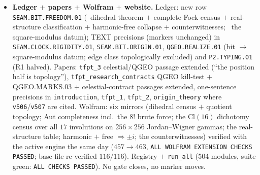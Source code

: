 \begin{itemize}[leftmargin=1.5em]
clock) --- the Fock dichotomy measures the CLASS, not the modulus. Premise typing: (P-i) deck $=$
M\"obius covering deck $\Rightarrow$ free [standard topology; the one-sidedness strand
\texttt{origin\_theory}/\texttt{v456}]; (P-ii) marks on the $\Theta$-fix seam circle $=$ existing
REALIZE \mC\ content (\texttt{QGEO.REALIZE.02} hypotheses, \texttt{v264}) --- NO new input. Audit
finding documented: ``circle-freeness'' was nowhere typed before (only mark-freeness, \texttt{v216});
\texttt{v507} F1.1 explicitly admitted the reflection reading of the edge class --- \texttt{v510}
closes that door (a reflection is not a covering deck). The \mC\ rest, verbatim: \emph{the alignment
bit reduces from ``harmonic AND central'' to the square-modulus datum $\tau=i$ alone; the position
half is topology (edge class excluded), the modulus half stays the one carrier input.}
Discovery provenance: \texttt{experiments/tfpt-discovery/qgeo\_realize\_deck\_freedom\_dihedral\_probe.py}
($14/14$) and \texttt{qgeo\_realize\_rp\_fixcircle\_moebius\_probe.py} ($16/16$), same day.
\item \textbf{Ledger $+$ papers $+$ Wolfram $+$ website.} Ledger: new row
\texttt{SEAM.BIT.FREEDOM.01} (\mE\ dihedral theorem $+$ complete Fock census $+$ real-structure
classification $+$ harmonic-free collapse $+$ counterwitnesses; \mC\ the square-modulus datum);
TEXT precisions (markers unchanged) in \texttt{SEAM.CLOCK.RIGIDITY.01}, \texttt{SEAM.BIT.ORIGIN.01},
\texttt{QGEO.REALIZE.01} (bit $\to$ square-modulus datum; edge class topologically excluded) and
\texttt{P2.TYPING.01} (R1 halved). Papers: \texttt{tfpt\_3} celestial/QGEO passage extended
(``the position half is topology''), \texttt{tfpt\_research\_contracts} QGEO kill-test $+$
QGEO.MARKS.03 $+$ celestial-contract passages extended, one-sentence precisions in
\texttt{introduction}, \texttt{tfpt\_1}, \texttt{tfpt\_2}, \texttt{origin\_theory} where
\texttt{v506}/\texttt{v507} are cited. Wolfram: six mirrors (dihedral census $+$ quotient topology;
Aut completeness incl.\ the $8!$ brute force; the $\mathrm{Cl}(16)$ dichotomy census over all $17$
involutions on $256\times256$ Jordan--Wigner gammas; the real-structure table; harmonic $+$ free
$\Rightarrow\pm i$; the counterwitnesses) verified with the active engine the same day
($457\to463$, \texttt{ALL WOLFRAM EXTENSION CHECKS PASSED}; base file re-verified $116/116$).
Registry $+$ \texttt{run\_all} (504 modules, suite green: \texttt{ALL CHECKS PASSED}).
No gate closes, no marker moves.
\end{itemize}

